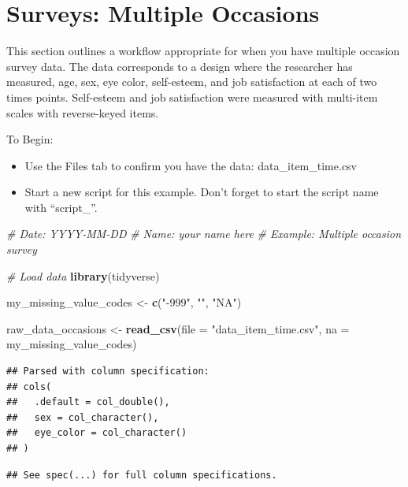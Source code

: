 \documentclass[
]{krantz}
\makeatletter
\newenvironment{Shaded}{\begin{snugshade}}{\end{snugshade}}
\newcommand{\CommentTok}[1]{\textcolor[rgb]{0.37,0.37,0.37}{\textit{#1}}}
\newcommand{\DataTypeTok}[1]{\textcolor[rgb]{0.27,0.27,0.27}{#1}}
\newcommand{\KeywordTok}[1]{\textcolor[rgb]{0.27,0.27,0.27}{\textbf{#1}}}
\newcommand{\NormalTok}[1]{#1}
\newcommand{\StringTok}[1]{\textcolor[rgb]{0.5,0.5,0.5}{#1}}
\newenvironment{kframe}{%
\medskip{}
\setlength{\fboxsep}{.8em}
 \def\at@end@of@kframe{}%
 \ifinner\ifhmode%
  \def\at@end@of@kframe{\end{minipage}}%
  \begin{minipage}{\columnwidth}%
 \fi\fi%
 \def\FrameCommand##1{\hskip\@totalleftmargin \hskip-\fboxsep
 \colorbox{shadecolor}{##1}\hskip-\fboxsep
     \hskip-\linewidth \hskip-\@totalleftmargin \hskip\columnwidth}%
 \MakeFramed {\advance\hsize-\width
   \@totalleftmargin\z@ \linewidth\hsize
   \@setminipage}}%
 {\par\unskip\endMakeFramed%
 \at@end@of@kframe}
\renewenvironment{Shaded}{\begin{kframe}}{\end{kframe}}
\makeatother
\begin{document}
\hypertarget{surveys-multiple-occasions}{%
\section{Surveys: Multiple Occasions}\label{surveys-multiple-occasions}}

This section outlines a workflow appropriate for when you have multiple occasion survey data. The data corresponds to a design where the researcher has measured, age, sex, eye color, self-esteem, and job satisfaction at each of two times points. Self-esteem and job satisfaction were measured with multi-item scales with reverse-keyed items.

To Begin:

\begin{itemize}
\item
  Use the Files tab to confirm you have the data: data\_item\_time.csv
\item
  Start a new script for this example. Don't forget to start the script name with ``script\_''.
\end{itemize}

\begin{Shaded}
\begin{Highlighting}[]
\CommentTok{# Date: YYYY-MM-DD}
\CommentTok{# Name: your name here}
\CommentTok{# Example: Multiple occasion survey}

\CommentTok{# Load data}
\KeywordTok{library}\NormalTok{(tidyverse)}

\NormalTok{my_missing_value_codes <-}\StringTok{ }\KeywordTok{c}\NormalTok{(}\StringTok{"-999"}\NormalTok{, }\StringTok{""}\NormalTok{, }\StringTok{"NA"}\NormalTok{)}

\NormalTok{raw_data_occasions <-}\StringTok{ }\KeywordTok{read_csv}\NormalTok{(}\DataTypeTok{file =} \StringTok{"data_item_time.csv"}\NormalTok{,}
                               \DataTypeTok{na =}\NormalTok{ my_missing_value_codes)}
\end{Highlighting}
\end{Shaded}

\begin{verbatim}
## Parsed with column specification:
## cols(
##   .default = col_double(),
##   sex = col_character(),
##   eye_color = col_character()
## )
\end{verbatim}

\begin{verbatim}
## See spec(...) for full column specifications.
\end{verbatim}
\end{document}
